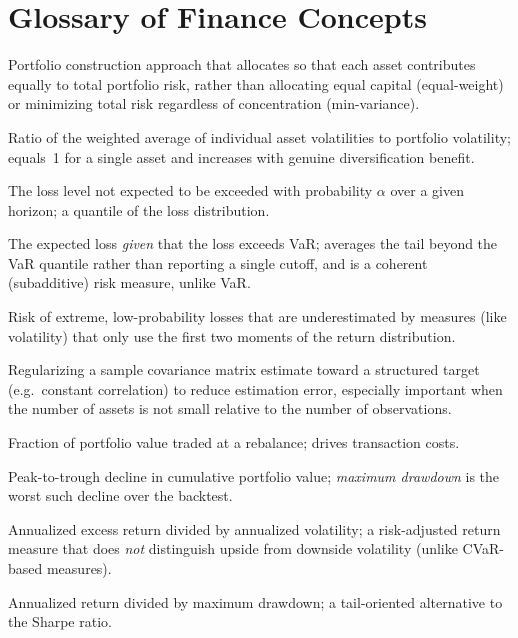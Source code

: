 \documentclass[11pt]{article}
\begin{document}
\section{Glossary of Finance Concepts}
\label{sec:glossary}

\begin{description}[leftmargin=3.5cm, style=nextline]
    \item[Risk parity / ERC] Portfolio construction approach that
    allocates so that each asset contributes equally to total portfolio
    risk, rather than allocating equal capital (equal-weight) or
    minimizing total risk regardless of concentration (min-variance).
    \item[Diversification ratio] Ratio of the weighted average of
    individual asset volatilities to portfolio volatility; equals~1 for a
    single asset and increases with genuine diversification benefit.
    \item[Value at Risk (VaR)] The loss level not expected to be exceeded
    with probability $\alpha$ over a given horizon; a quantile of the
    loss distribution.
    \item[Conditional VaR (CVaR) / Expected Shortfall] The expected loss
    \emph{given} that the loss exceeds VaR; averages the tail beyond the
    VaR quantile rather than reporting a single cutoff, and is a coherent
    (subadditive) risk measure, unlike VaR.
    \item[Tail risk] Risk of extreme, low-probability losses that are
    underestimated by measures (like volatility) that only use the first
    two moments of the return distribution.
    \item[Covariance shrinkage] Regularizing a sample covariance matrix
    estimate toward a structured target (e.g.\ constant correlation) to
    reduce estimation error, especially important when the number of
    assets is not small relative to the number of observations.
    \item[Turnover] Fraction of portfolio value traded at a rebalance;
    drives transaction costs.
    \item[Drawdown] Peak-to-trough decline in cumulative portfolio value;
    \emph{maximum drawdown} is the worst such decline over the backtest.
    \item[Sharpe ratio] Annualized excess return divided by annualized
    volatility; a risk-adjusted return measure that does \emph{not}
    distinguish upside from downside volatility (unlike CVaR-based
    measures).
    \item[Calmar ratio] Annualized return divided by maximum drawdown; a
    tail-oriented alternative to the Sharpe ratio.
\end{description}
\end{document}
